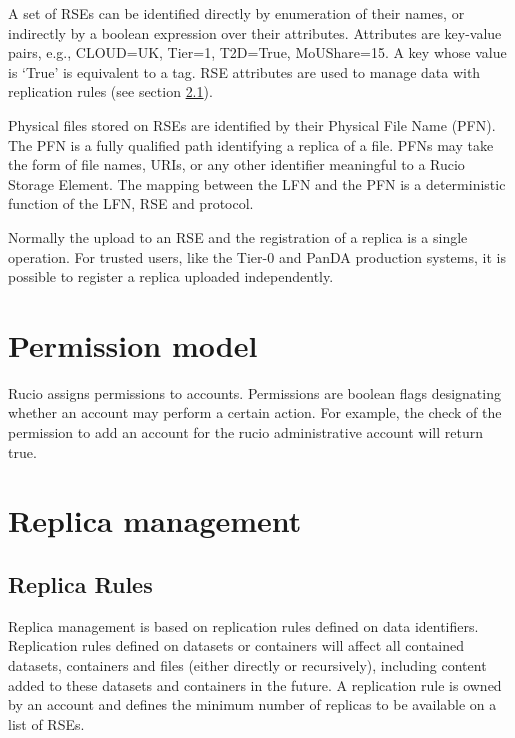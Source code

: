 \documentclass{atlasnote}
\begin{document}
\noindent A set of RSEs can be identified directly by enumeration of their names, or indirectly by a boolean expression over their attributes. Attributes are key-value pairs, e.g., CLOUD=UK, Tier=1, T2D=True, MoUShare=15. A key whose value is ‘True’ is equivalent to a tag. RSE attributes are used to manage data with replication rules (see section \ref{sec:replica-rules}).

Physical files stored on RSEs are identified by their Physical File Name (PFN). The PFN is a fully qualified path identifying a replica of a file. PFNs may take the form of file names, URIs, or any other identifier meaningful to a Rucio Storage Element. The mapping between the LFN and the PFN is a deterministic function of the LFN, RSE and protocol.

Normally the upload to an RSE and the registration of a replica is a single operation. For trusted users, like the Tier-0 and PanDA production systems, it is possible to register a replica uploaded independently.

\section{Permission model}
\label{overview_Permission_model:permission-model}

Rucio assigns permissions to accounts. Permissions are boolean flags designating whether an account may perform a certain action. For example, the check of the permission to add an account for the rucio administrative account will return true.

\section{Replica management}
\label{overview_Replica_management:replica-management}

\subsection{Replica Rules}
\label{sec:replica-rules}

Replica management is based on replication rules defined on data identifiers. Replication rules defined on datasets or containers will affect all contained datasets, containers and files (either directly or recursively), including content added to these datasets and containers in the future. A replication rule is owned by an account and defines the minimum number of replicas to be available on a list of RSEs.
\end{document}
